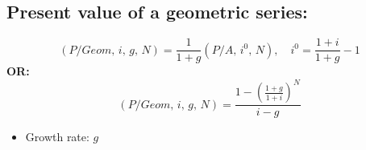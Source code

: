 \subsection{Present value of a geometric series:}
\begin{definition}
    \begin{equation}
        \left(P/Geom, \, i, \, g, \, N\right) = \frac{1}{1+g} \left(P/A, \, i^0, \, N\right), \quad i^0 = \frac{1+i}{1+g} - 1
    \end{equation}
    \textbf{OR:}
    \begin{equation}
        \left(P/Geom, \, i, \, g, \, N\right) = \frac{1 - \left(\frac{1+g}{1+i}\right)^N}{i - g}
    \end{equation}
    \begin{itemize}
        \item Growth rate: $g$
    \end{itemize}
\end{definition}